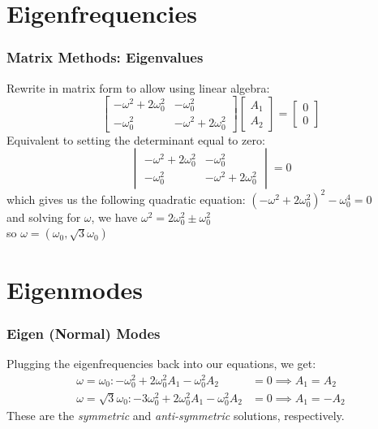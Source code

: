 \documentclass[pdf,hideothersubsections]{beamer}
\begin{document}
\section{Eigenfrequencies}
\begin{frame}
\frametitle{Matrix Methods: Eigenvalues}
\pause
Rewrite in matrix form to allow using linear algebra: \\
\[
\begin{bmatrix}
-\omega^2 + 2 \omega_0^2 & -\omega_0^2 \\
-\omega_0^2 & -\omega^2 + 2 \omega_0^2
\end{bmatrix}
\begin{bmatrix}
A_1 \\
A_2
\end{bmatrix}
=
\begin{bmatrix}
0 \\
0
\end{bmatrix}
\]
\pause
Equivalent to setting the determinant equal to zero:
\[
\begin{vmatrix}
-\omega^2 + 2 \omega_0^2 & -\omega_0^2 \\
-\omega_0^2 & -\omega^2 + 2 \omega_0^2
\end{vmatrix}
= 0
\]
\pause
which gives us the following quadratic equation:
\pause
$(-\omega^2 + 2 \omega_0^2)^2 -\omega_0^4 = 0$ \\
\pause
and solving for $\omega$, we have
\centering
\pause
$\omega^2 = 2 \omega_0^2 \pm \omega_0^2$ \\
\pause
so $\omega = (\omega_0, \sqrt{3} \omega_0)$

\end{frame}










\section{Eigenmodes}
\begin{frame}
\frametitle{Eigen (Normal) Modes}
\pause
Plugging the eigenfrequencies back into our equations, we get:
\pause
\begin{align}
\omega = \omega_0 :  -\omega_0^2 + 2 \omega_0^2 A_1 - \omega_0^2 A_2 &=
0 \implies A_1 = A_2\\
\omega = \sqrt{3} \omega_0 :  -3 \omega_0^2 + 2 \omega_0^2 A_1 - \omega_0^2 A_2 &=
0 \implies A_1 = - A_2
\end{align}
\pause
These are the \emph{symmetric} and \emph{anti-symmetric} solutions, respectively.


\end{frame}
\end{document}
